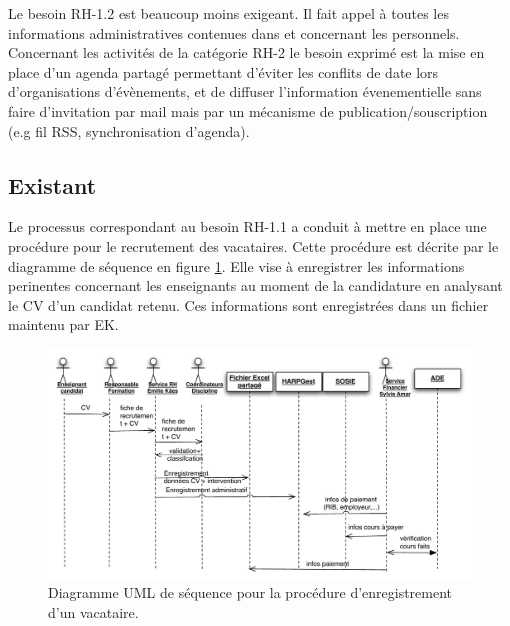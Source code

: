 \documentclass{book}
\begin{document}
Le besoin RH-1.2 est beaucoup moins exigeant. Il fait appel à toutes
les informations administratives contenues dans  
et  concernant les personnels.\\


Concernant les activités de la catégorie RH-2 le besoin exprimé 
est la mise en place d'un agenda partagé permettant d'éviter
les conflits de date lors d'organisations d'évènements, et de 
diffuser l'information évenementielle sans faire d'invitation
par mail mais par un mécanisme de publication/souscription
(e.g fil RSS, synchronisation d'agenda).  



\subsection{Existant}

Le processus correspondant au besoin RH-1.1 a conduit à mettre en
place une procédure pour le recrutement des vacataires. Cette procédure
est décrite par le diagramme de séquence en figure \ref{fg:rh_seq_vacataires}.
Elle vise à enregistrer les informations perinentes concernant les enseignants
au moment de la candidature en analysant le CV d'un candidat retenu. Ces
informations sont enregistrées dans un fichier  maintenu par EK.

\begin{figure}[hbt]
\begin{center}
\includegraphics[width=\linewidth]{figs/rh_seq_vacataires.pdf}
\end{center}
\caption{Diagramme UML de séquence pour la procédure d'enregistrement d'un vacataire.}
\label{fg:rh_seq_vacataires}
\end{figure}
\end{document}
